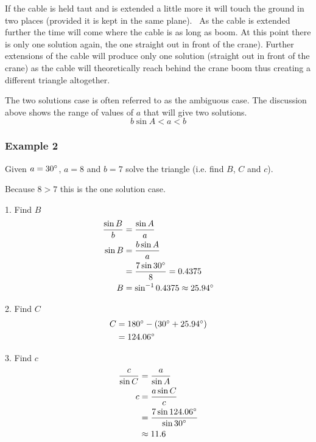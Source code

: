 If the cable is held taut and is extended a little more it will touch the ground in two places (provided it is kept in the same plane).
\ As the cable is extended further the time will come where the cable is as long as boom. At
this point there is only one solution again, the one straight out in front of the crane). Further extensions
of the cable will produce only one solution (straight out in front of the crane) as the cable will theoretically reach behind the crane boom thus creating
a different triangle altogether. 

The two solutions case is often referred to as the ambiguous case. The
discussion above shows the range of values of $a$ that will give two solutions.
\begin{equation*}b \sin  A <a <b
\end{equation*}

\subsubsection{Example 2}
Given $a =30 \mbox{{\ensuremath{{}^\circ}}}$, $a =8$ and $b =7$ solve the triangle (i.e. find $B$, $C$ and $c$). 

   
\setlength\fboxrule{0in}\setlength\fboxsep{0.2in}


Because $8 >7$ this is the one solution case. 

1. Find $B$
\begin{align*}\frac{\sin  B}{b} &  = \frac{\sin  A}{a} \\
\sin  B &  = \frac{b \sin  A}{a} \\
 &  = \frac{7 \sin  30 \mbox{{\ensuremath{{}^\circ}}}}{8} =0.4375 \\
B &  = \sin ^{ -1} 0.4375 \approx 25.94 \mbox{{\ensuremath{{}^\circ}}}\end{align*}

2. Find $C$
\begin{align*}C &  = 180 \mbox{{\ensuremath{{}^\circ}}} -(30 \mbox{{\ensuremath{{}^\circ}}} +25.94 \mbox{{\ensuremath{{}^\circ}}}) \\
 &  = 124.06 \mbox{{\ensuremath{{}^\circ}}}\end{align*}

3. Find $c$
\begin{align*}\frac{c}{\sin  C} &  = \frac{a}{\sin  A} \\
c &  = \frac{a \sin  C}{c} \\
 &  = \frac{7 \sin  124.06 \mbox{{\ensuremath{{}^\circ}}}}{\sin  30 \mbox{{\ensuremath{{}^\circ}}}} \\
 &  \approx   11.6\end{align*}

